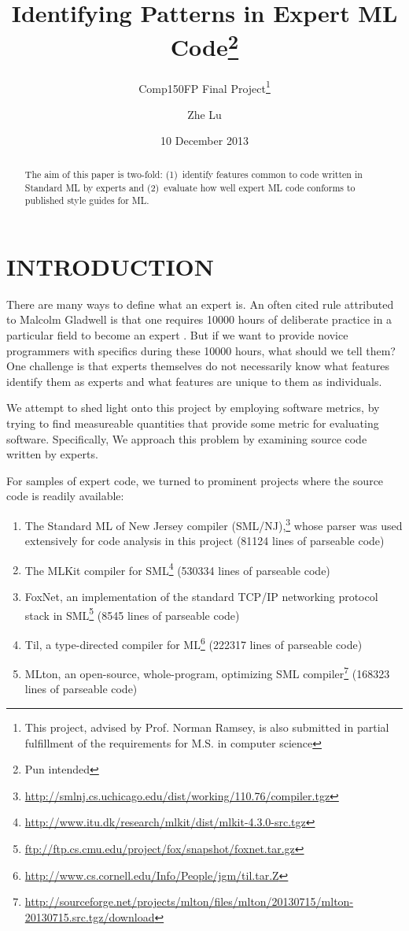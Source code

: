 \documentclass[12pt,abstracton]{scrartcl}
\title{Identifying Patterns in Expert ML Code\footnote{Pun intended}}
\subtitle{Comp150FP Final Project\footnote{This project, advised by Prof. Norman Ramsey, is also submitted in partial fulfillment of the requirements for M.S. in computer science}}
\author{Zhe Lu}
\date{10 December 2013}
\begin{document}


\maketitle
\begin{abstract}
The aim of this paper is two-fold: (1)~identify features common to code written in Standard ML by experts and
(2)~evaluate how well expert ML code conforms to published style guides for ML.
\end{abstract}
\section{INTRODUCTION}
There are many ways to define what an expert is.
An often cited rule attributed to Malcolm Gladwell is that one requires 10000 hours of deliberate practice
in a particular field to become an expert \cite{Gla08}. But if we want to provide novice programmers
with specifics during these 10000 hours, what should we tell them? One challenge is that experts themselves
do not necessarily know what features identify them as experts and what features are unique to them as individuals.

We attempt to shed light onto this project by employing software metrics, by trying to find measureable quantities
that provide some metric for evaluating software. Specifically,
We approach this problem by examining source code written by experts.

For samples of expert code, we turned to prominent projects where the source code is readily available:
\begin{enumerate}
\item The Standard ML of New Jersey compiler (SML/NJ),\footnote{\url{http://smlnj.cs.uchicago.edu/dist/working/110.76/compiler.tgz}} whose parser was used extensively for code analysis in this project (81124 lines of parseable code)
\item The MLKit compiler for SML\footnote{\url{http://www.itu.dk/research/mlkit/dist/mlkit-4.3.0-src.tgz}} (530334 lines of parseable code)
\item FoxNet, an implementation of the standard TCP/IP networking protocol stack in SML\footnote{\url{ftp://ftp.cs.cmu.edu/project/fox/snapshot/foxnet.tar.gz}} (8545 lines of parseable code)
\item Til, a type-directed compiler for ML\footnote{\url{http://www.cs.cornell.edu/Info/People/jgm/til.tar.Z}} (222317 lines of parseable code)
\item MLton, an open-source, whole-program, optimizing SML compiler\footnote{\url{http://sourceforge.net/projects/mlton/files/mlton/20130715/mlton-20130715.src.tgz/download}} (168323 lines of parseable code)
\end{enumerate}
\end{document}
